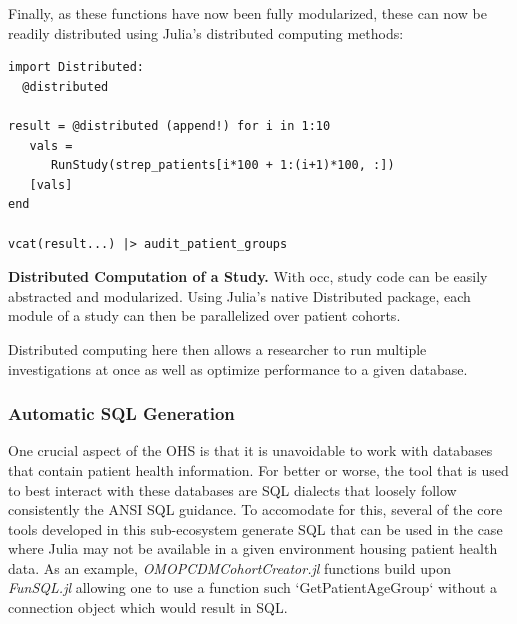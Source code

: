 \documentclass{juliacon}
\begin{document}
Finally, as these functions have now been fully modularized, these can now be readily distributed using Julia's distributed computing methods:

\begin{listing}[!ht]
\begin{verbatim}
import Distributed:
  @distributed 

result = @distributed (append!) for i in 1:10
   vals = 
      RunStudy(strep_patients[i*100 + 1:(i+1)*100, :])
   [vals]
end

vcat(result...) |> audit_patient_groups
\end{verbatim}
\caption{\textbf{Distributed Computation of a Study.} With occ, study code can be easily abstracted and modularized. Using Julia's native Distributed package, each module of a study can then be parallelized over patient cohorts.}
\label{listing:study_parallelization}
\end{listing}

Distributed computing here then allows a researcher to run multiple investigations at once as well as optimize performance to a given database.

\subsubsection{Automatic SQL Generation}

One crucial aspect of the OHS is that it is unavoidable to work with databases that contain patient health information.
For better or worse, the tool that is used to best interact with these databases are SQL dialects that loosely follow consistently the ANSI SQL guidance.\cite{kelechavaSQLStandardISO2018}
To accomodate for this, several of the core tools developed in this sub-ecosystem generate SQL that can be used in the case where Julia may not be available in a given environment housing patient health data.
As an example, \textit{OMOPCDMCohortCreator.jl} functions build upon \textit{FunSQL.jl} allowing one to use a function such `GetPatientAgeGroup` without a connection object which would result in SQL.
\end{document}
